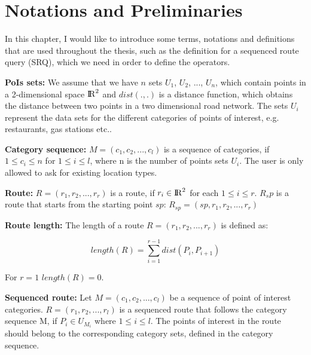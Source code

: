 \chapter{Notations and Preliminaries} 
\label{sec:notes}
In this chapter, I would like to introduce some terms, notations and definitions that are used throughout the thesis, such as the definition for a sequenced route query (SRQ), which we need in order to define the operators. \newline

\textbf{PoIs sets:} We assume that we have $n$ sets $U_1$, $U_2$, ..., $U_n$, which contain points in a 2-dimensional space ${\rm I\!R}^2$ and $dist(., .)$ is a distance function, which obtains the distance between two points in a two dimensional road network. The sets $U_i$ represent the data sets for the different categories of points of interest, e.g. restaurants, gas stations etc.. \newline

\textbf{Category sequence:} $M = (c_1, c_2, ..., c_l)$ is a sequence of categories, if $1 \leq c_i \leq n$ for $1 \leq i \leq l$, where n is the number of points sets $U_i$. The user is only allowed to ask for existing location types. \newline

\textbf{Route:} $R =(r_1, r_2, ..., r_r)$ is a route, if $r_i \in {\rm I\!R}^2$ for each $1 \leq i \leq r$. $R_sp$ is a route that starts from the starting point $sp$: $R_{sp} = (sp, r_1, r_2, ..., r_r)$\newline

\textbf{Route length:} The length of a route $R = (r_1, r_2, ..., r_r)$ is defined as:

\begin{equation}
length(R) = \sum_{i=1}^{r-1} dist(P_i, P_{i+1})
\end{equation}

For $r = 1$ $length(R) = 0$.
\newline

\textbf{Sequenced route:} Let $M = (c_1, c_2, ..., c_l)$ be a sequence of point of interest categories. $R = (r_1, r_2, ..., r_l)$ is a sequenced route that follows the category sequence M, if $P_i \in U_{M_i}$ where $1 \leq i \leq l$. The points of interest in the route should belong to the corresponding category sets, defined in the category sequence. \newline

